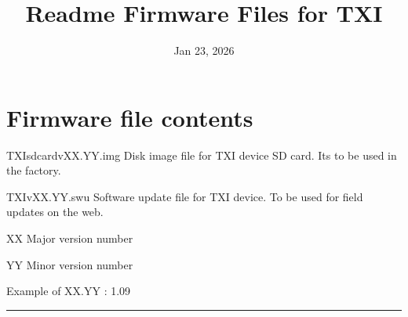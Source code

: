 \documentclass[letterpaper,10pt,english]{sphinxhowto}
\title{Readme Firmware Files for TXI}
\date{Jan 23, 2026}
\author{}
\begin{document}
\pagestyle{empty}

\pagestyle{plain}

\pagestyle{normal}
\label{\detokenize{index::doc}}


\sphinxstepscope


\section{Firmware file contents}
\label{\detokenize{topics/readme_fwf:firmware-file-contents}}\label{\detokenize{topics/readme_fwf::doc}}
\sphinxAtStartPar
TXI\sphinxhyphen{}sdcard\sphinxhyphen{}vXX.YY.img \sphinxhyphen{} Disk image file for TXI device SD card. Its to be used in the factory.

\sphinxAtStartPar
TXI\sphinxhyphen{}vXX.YY.swu \sphinxhyphen{} Software update file for TXI device. To be used for field updates on the web.

\sphinxAtStartPar
XX \sphinxhyphen{} Major version number

\sphinxAtStartPar
YY \sphinxhyphen{} Minor version number

\sphinxAtStartPar
Example of XX.YY : 1.09


\bigskip\hrule\bigskip




\renewcommand{\indexname}{Index}
\printindex
\end{document}
